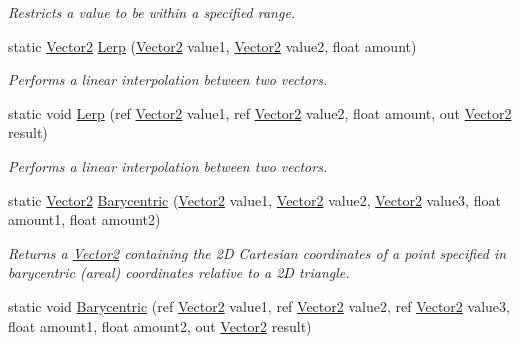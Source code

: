 \begin{DoxyCompactItemize}
\begin{DoxyCompactList}\small\item\em Restricts a value to be within a specified range.\end{DoxyCompactList}\item 
static \hyperlink{struct_microsoft_1_1_xna_1_1_framework_1_1_vector2}{Vector2} \hyperlink{struct_microsoft_1_1_xna_1_1_framework_1_1_vector2_af24b6e17b0b78a82e7a65ed4dd475a3f}{Lerp} (\hyperlink{struct_microsoft_1_1_xna_1_1_framework_1_1_vector2}{Vector2} value1, \hyperlink{struct_microsoft_1_1_xna_1_1_framework_1_1_vector2}{Vector2} value2, float amount)
\begin{DoxyCompactList}\small\item\em Performs a linear interpolation between two vectors.\end{DoxyCompactList}\item 
static void \hyperlink{struct_microsoft_1_1_xna_1_1_framework_1_1_vector2_ab37033f40e6ce0658ca6a11649eeb207}{Lerp} (ref \hyperlink{struct_microsoft_1_1_xna_1_1_framework_1_1_vector2}{Vector2} value1, ref \hyperlink{struct_microsoft_1_1_xna_1_1_framework_1_1_vector2}{Vector2} value2, float amount, out \hyperlink{struct_microsoft_1_1_xna_1_1_framework_1_1_vector2}{Vector2} result)
\begin{DoxyCompactList}\small\item\em Performs a linear interpolation between two vectors.\end{DoxyCompactList}\item 
static \hyperlink{struct_microsoft_1_1_xna_1_1_framework_1_1_vector2}{Vector2} \hyperlink{struct_microsoft_1_1_xna_1_1_framework_1_1_vector2_a401c97e9ff1e0069a6cc8d338654dc9c}{Barycentric} (\hyperlink{struct_microsoft_1_1_xna_1_1_framework_1_1_vector2}{Vector2} value1, \hyperlink{struct_microsoft_1_1_xna_1_1_framework_1_1_vector2}{Vector2} value2, \hyperlink{struct_microsoft_1_1_xna_1_1_framework_1_1_vector2}{Vector2} value3, float amount1, float amount2)
\begin{DoxyCompactList}\small\item\em Returns a \hyperlink{struct_microsoft_1_1_xna_1_1_framework_1_1_vector2}{Vector2} containing the 2\+D Cartesian coordinates of a point specified in barycentric (areal) coordinates relative to a 2\+D triangle.\end{DoxyCompactList}\item 
static void \hyperlink{struct_microsoft_1_1_xna_1_1_framework_1_1_vector2_a8dc8ac35776dc098cfc89a502449b9c4}{Barycentric} (ref \hyperlink{struct_microsoft_1_1_xna_1_1_framework_1_1_vector2}{Vector2} value1, ref \hyperlink{struct_microsoft_1_1_xna_1_1_framework_1_1_vector2}{Vector2} value2, ref \hyperlink{struct_microsoft_1_1_xna_1_1_framework_1_1_vector2}{Vector2} value3, float amount1, float amount2, out \hyperlink{struct_microsoft_1_1_xna_1_1_framework_1_1_vector2}{Vector2} result)

\end{DoxyCompactItemize}
